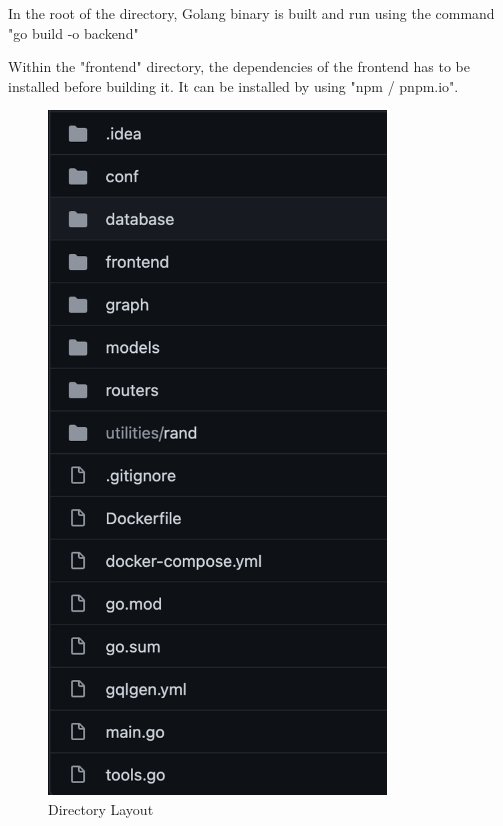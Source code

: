 \documentclass[12pt,a4paper]{report}
\begin{document}
In the root of the directory, Golang binary is built and run using the command "go build -o backend" 

Within the "frontend" directory, the dependencies of the frontend has to be installed before building it. It can be installed by using "npm / pnpm.io".

\begin{figure}[h]
\begin{center}
\includegraphics[width=0.8\textwidth,scale=0.25]{images/directory-layout.png}	
\end{center}
\caption{Directory Layout}
\label{fig:dirlayout}
\end{figure}
\end{document}

